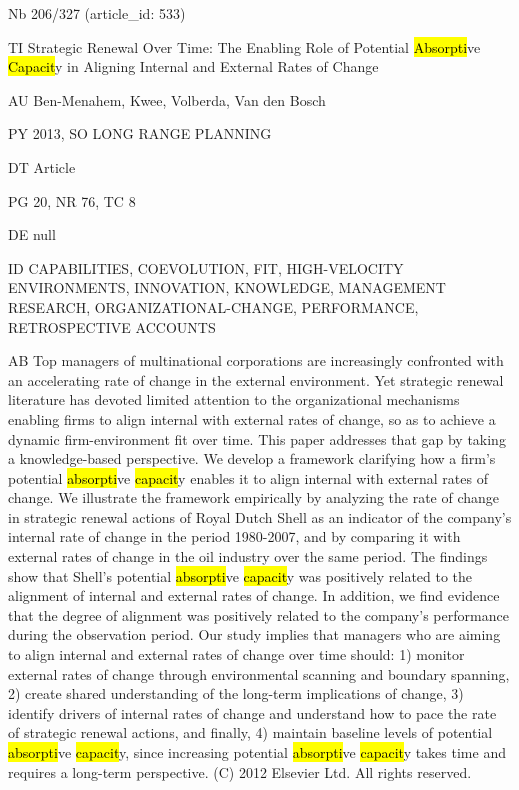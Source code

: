 \documentclass[a4paper]{article}
\begin{document}
\vspace*{-2cm}
Nb \tabto{0cm}206/327 (article\_id: 533)\par
TI \tabto{0cm}Strategic Renewal Over Time: The Enabling Role of Potential \hl{Absorpti}ve \hl{Capacit}y in Aligning Internal and External Rates of Change\par
AU \tabto{0cm}Ben-Menahem, Kwee, Volberda, Van den Bosch\par
PY \tabto{0cm}2013, SO LONG RANGE PLANNING\par
DT \tabto{0cm}Article\par
PG \tabto{0cm}20, NR 76, TC 8\par
DE \tabto{0cm}null\par
ID \tabto{0cm}CAPABILITIES, COEVOLUTION, FIT, HIGH-VELOCITY ENVIRONMENTS, INNOVATION, KNOWLEDGE, MANAGEMENT RESEARCH, ORGANIZATIONAL-CHANGE, PERFORMANCE, RETROSPECTIVE ACCOUNTS\par
AB \tabto{0cm}Top managers of multinational corporations are increasingly confronted with an accelerating rate of change in the external environment. Yet strategic renewal literature has devoted limited attention to the organizational mechanisms enabling firms to align internal with external rates of change, so as to achieve a dynamic firm-environment fit over time. This paper addresses that gap by taking a knowledge-based perspective. We develop a framework clarifying how a firm's potential \hl{absorpti}ve \hl{capacit}y enables it to align internal with external rates of change. We illustrate the framework empirically by analyzing the rate of change in strategic renewal actions of Royal Dutch Shell as an indicator of the company's internal rate of change in the period 1980-2007, and by comparing it with external rates of change in the oil industry over the same period. The findings show that Shell's potential \hl{absorpti}ve \hl{capacit}y was positively related to the alignment of internal and external rates of change. In addition, we find evidence that the degree of alignment was positively related to the company's performance during the observation period. Our study implies that managers who are aiming to align internal and external rates of change over time should: 1) monitor external rates of change through environmental scanning and boundary spanning, 2) create shared understanding of the long-term implications of change, 3) identify drivers of internal rates of change and understand how to pace the rate of strategic renewal actions, and finally, 4) maintain baseline levels of potential \hl{absorpti}ve \hl{capacit}y, since increasing potential \hl{absorpti}ve \hl{capacit}y takes time and requires a long-term perspective. (C) 2012 Elsevier Ltd. All rights reserved.\par
\clearpage
\end{document}
